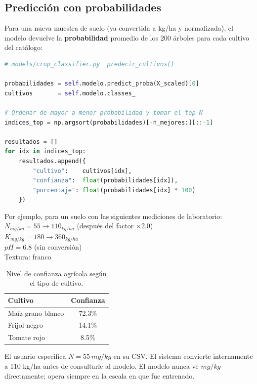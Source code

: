 \documentclass[12pt]{article}
\begin{document}
\subsection{Predicción con probabilidades}
Para una nueva muestra de suelo (ya convertida a kg/ha y normalizada), el modelo devuelve la \textbf{probabilidad} promedio de los 200 árboles para cada cultivo del catálogo:
\begin{lstlisting}[language=Python]
# models/crop_classifier.py  predecir_cultivos()

probabilidades = self.modelo.predict_proba(X_scaled)[0]
cultivos       = self.modelo.classes_

# Ordenar de mayor a menor probabilidad y tomar el top N
indices_top = np.argsort(probabilidades)[-n_mejores:][::-1]

resultados = []
for idx in indices_top:
    resultados.append({
        "cultivo":    cultivos[idx],
        "confianza":  float(probabilidades[idx]),
        "porcentaje": float(probabilidades[idx] * 100)
    })
\end{lstlisting}
Por ejemplo, para un suelo con las siguientes mediciones de laboratorio:
\\$N_{mg/kg} = 55  \xrightarrow{} 110_{kg/ha}$  (después del factor ×2.0)
\\$K_{mg/kg} = 180 \xrightarrow{} 360_{kg/ha}$
\\$pH = 6.8$ (sin conversión)
\\Textura: franco

\begin{table}[htpb]
\centering
\caption{Nivel de confianza agrícola según el tipo de cultivo.}
\label{tab:confianza_cultivo}
\begin{tabular}{lc}
\toprule
\textbf{Cultivo} & \textbf{Confianza} \\
\midrule
Maíz grano blanco & 72.3\% \\
Frijol negro      & 14.1\% \\
Tomate rojo       &  8.5\% \\
\bottomrule
\end{tabular}
\end{table}

El usuario especifica $N = 55\ mg/kg$ en su CSV. El sistema convierte internamente a 110 kg/ha antes de consultarle al modelo. El modelo nunca ve $mg/kg$ directamente; opera siempre en la escala en que fue entrenado.
\end{document}
